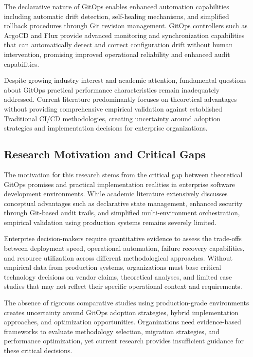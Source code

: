 The declarative nature of GitOps enables enhanced automation capabilities including automatic drift detection, self-healing mechanisms, and simplified rollback procedures through Git revision management. GitOps controllers such as ArgoCD \cite{argocd2023} and Flux \cite{flux2023} provide advanced monitoring and synchronization capabilities that can automatically detect and correct configuration drift without human intervention, promising improved operational reliability and enhanced audit capabilities.

Despite growing industry interest and academic attention, fundamental questions about GitOps practical performance characteristics remain inadequately addressed. Current literature predominantly focuses on theoretical advantages without providing comprehensive empirical validation against established Traditional CI/CD methodologies, creating uncertainty around adoption strategies and implementation decisions for enterprise organizations.

\subsection{Research Motivation and Critical Gaps}
The motivation for this research stems from the critical gap between theoretical GitOps promises and practical implementation realities in enterprise software development environments. While academic literature extensively discusses conceptual advantages such as declarative state management, enhanced security through Git-based audit trails, and simplified multi-environment orchestration, empirical validation using production systems remains severely limited.

Enterprise decision-makers require quantitative evidence to assess the trade-offs between deployment speed, operational automation, failure recovery capabilities, and resource utilization across different methodological approaches. Without empirical data from production systems, organizations must base critical technology decisions on vendor claims, theoretical analyses, and limited case studies that may not reflect their specific operational context and requirements.

The absence of rigorous comparative studies using production-grade environments creates uncertainty around GitOps adoption strategies, hybrid implementation approaches, and optimization opportunities. Organizations need evidence-based frameworks to evaluate methodology selection, migration strategies, and performance optimization, yet current research provides insufficient guidance for these critical decisions.

